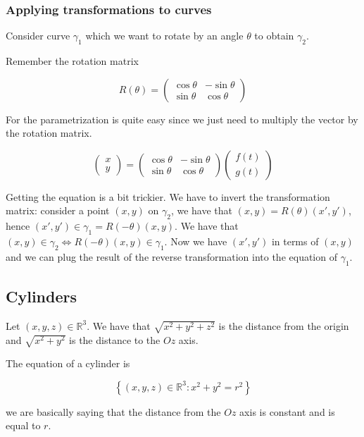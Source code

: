\documentclass[10pt]{extarticle}
\newcommand{\R}{\mathbb{R}}
\begin{document}
\subsubsection{Applying transformations to curves}

Consider curve $\gamma_1$ which we want to rotate by an angle $\theta$ to obtain $\gamma_2$.

Remember the rotation matrix

$$
    R(\theta) = \begin{pmatrix}
        \cos \theta & -\sin \theta \\
        \sin \theta & \cos \theta
    \end{pmatrix}
$$

For the parametrization is quite easy since we just need to multiply the vector by the rotation matrix.

$$
    \begin{pmatrix}
        x \\ y
    \end{pmatrix} = \begin{pmatrix}
        \cos \theta & -\sin \theta \\
        \sin \theta & \cos \theta
    \end{pmatrix} \begin{pmatrix}
        f(t) \\ g(t)
    \end{pmatrix}
$$

Getting the equation is a bit trickier.
We have to invert the transformation matrix:
consider a point $(x, y)$ on $\gamma_2$, we have that $(x, y) = R(\theta) (x', y')$, hence $(x', y') \in \gamma_1 = R(-\theta) (x, y)$.
We have that $(x,y) \in \gamma_2 \iff R(-\theta)(x, y) \in \gamma_1$.
Now we have $(x', y')$ in terms of $(x, y)$ and we can plug the result of the reverse transformation into the equation of $\gamma_1$.

\subsection{Cylinders}

Let $(x, y, z) \in \R^3$. We have that $\sqrt{x^2 + y^2 + z^2}$ is the distance from the origin and $\sqrt{x^2 + y^2}$ is the distance to the $Oz$ axis.

The equation of a cylinder is

$$
    \left\{ (x, y, z) \in \R^3  : x^2 + y^2 = r^2\right\}
$$

we are basically saying that the distance from the $Oz$ axis is constant and is equal to $r$.
\end{document}
